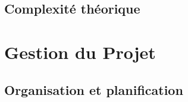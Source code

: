 \documentclass{report}
\begin{document}
\section{Complexité théorique}

\chapter{Gestion du Projet}
\section{Organisation et planification} 

\end{document}
